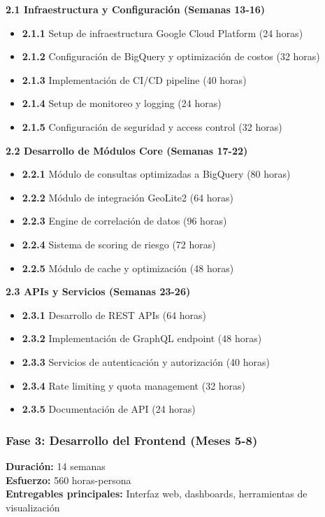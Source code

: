 \textbf{2.1 Infraestructura y Configuración (Semanas 13-16)}
\begin{itemize}
    \item \textbf{2.1.1} Setup de infraestructura Google Cloud Platform (24 horas)
    \item \textbf{2.1.2} Configuración de BigQuery y optimización de costos (32 horas)
    \item \textbf{2.1.3} Implementación de CI/CD pipeline (40 horas)
    \item \textbf{2.1.4} Setup de monitoreo y logging (24 horas)
    \item \textbf{2.1.5} Configuración de seguridad y access control (32 horas)
\end{itemize}

\textbf{2.2 Desarrollo de Módulos Core (Semanas 17-22)}
\begin{itemize}
    \item \textbf{2.2.1} Módulo de consultas optimizadas a BigQuery (80 horas)
    \item \textbf{2.2.2} Módulo de integración GeoLite2 (64 horas)
    \item \textbf{2.2.3} Engine de correlación de datos (96 horas)
    \item \textbf{2.2.4} Sistema de scoring de riesgo (72 horas)
    \item \textbf{2.2.5} Módulo de cache y optimización (48 horas)
\end{itemize}

\textbf{2.3 APIs y Servicios (Semanas 23-26)}
\begin{itemize}
    \item \textbf{2.3.1} Desarrollo de REST APIs (64 horas)
    \item \textbf{2.3.2} Implementación de GraphQL endpoint (48 horas)
    \item \textbf{2.3.3} Servicios de autenticación y autorización (40 horas)
    \item \textbf{2.3.4} Rate limiting y quota management (32 horas)
    \item \textbf{2.3.5} Documentación de API (24 horas)
\end{itemize}

\subsubsection{Fase 3: Desarrollo del Frontend (Meses 5-8)}
\textbf{Duración:} 14 semanas \\
\textbf{Esfuerzo:} 560 horas-persona \\
\textbf{Entregables principales:} Interfaz web, dashboards, herramientas de visualización

